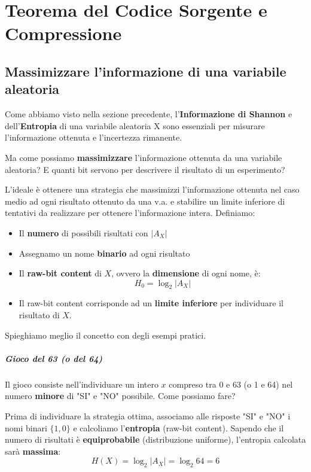 \chapter{Teorema del Codice Sorgente e Compressione}

\section{Massimizzare l'informazione di una variabile aleatoria}

Come abbiamo visto nella sezione precedente, l'\textbf{Informazione di Shannon} e dell'\textbf{Entropia} di una variabile aleatoria X sono essenziali per misurare l'informazione ottenuta e l'incertezza rimanente. 

Ma come possiamo \textbf{massimizzare} l'informazione ottenuta da una variabile aleatoria? E quanti bit servono per descrivere il risultato di un esperimento?

L'ideale è ottenere una strategia che massimizzi l'informazione ottenuta nel caso medio ad ogni risultato ottenuto da una v.a. e stabilire un limite inferiore di tentativi da realizzare per ottenere l'informazione intera.
Definiamo:
\begin{itemize}
	\item Il \textbf{numero} di possibili risultati con $|A_X|$
	\item Assegnamo un nome \textbf{binario} ad ogni risultato
	\item Il \textbf{raw-bit content} di $X$, ovvero la \textbf{dimensione} di ogni nome, è: $$H_0 =\log_{2}|A_X|$$
	\item Il raw-bit content corrisponde ad un \textbf{limite inferiore} per individuare il risultato di $X$.
\end{itemize}
%
Spieghiamo meglio il concetto con degli esempi pratici.

\paragraph{Gioco del 63 (o del 64)}
Il gioco consiste nell'individuare un intero $x$ compreso tra 0 e 63 (o 1 e 64) nel numero \textbf{minore} di "SI" e "NO" possibile. Come possiamo fare?

Prima di individuare la strategia ottima, associamo alle risposte "SI" e "NO" i nomi binari $\{1, 0\}$ e calcoliamo l'\textbf{entropia} (raw-bit content). Sapendo che il numero di risultati è \textbf{equiprobabile} (distribuzione uniforme), l'entropia calcolata sarà \textbf{massima}:
$$
H(X) = \log_{2} |A_X| = \log_{2} 64 = 6 
$$


